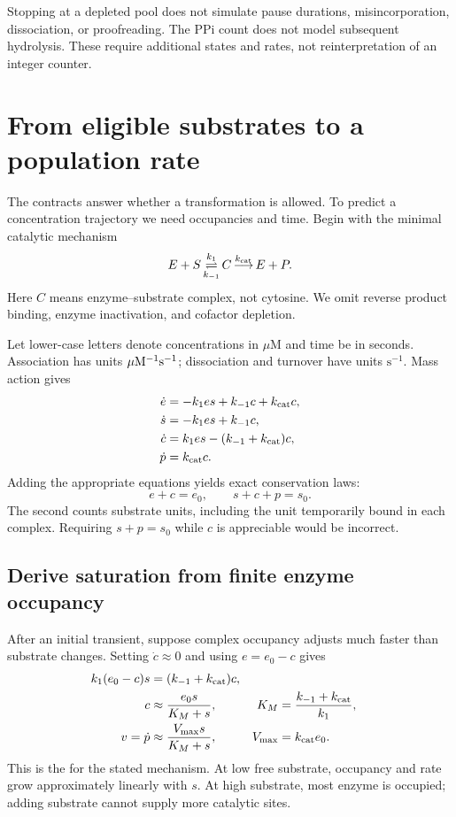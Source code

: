 Stopping at a depleted pool does not simulate pause durations, misincorporation, dissociation, or proofreading. The PPi count does not model subsequent hydrolysis. These require additional states and rates, not reinterpretation of an integer counter.

\section{From eligible substrates to a population rate}

The contracts answer whether a transformation is allowed. To predict a concentration trajectory we need occupancies and time. Begin with the minimal catalytic mechanism
\begin{equation}
E+S \mathop{\rightleftharpoons}^{k_1}_{k_{-1}} C
\mathop{\longrightarrow}^{k_{\rm cat}} E+P.
\label{eq:enzyme}
\end{equation}
Here $C$ means enzyme--substrate complex, not cytosine. We omit reverse product binding, enzyme inactivation, and cofactor depletion.

Let lower-case letters denote concentrations in $\mu$M and time be in seconds. Association has units $\mu{\rm M}^{-1}{\rm s}^{-1}$; dissociation and turnover have units $\mathrm{s}^{-1}$. Mass action gives
\begin{align}
\dot e&=-k_1es+k_{-1}c+k_{\rm cat}c,\\
\dot s&=-k_1es+k_{-1}c,\\
\dot c&=k_1es-(k_{-1}+k_{\rm cat})c,\\
\dot p&=k_{\rm cat}c.
\label{eq:full}
\end{align}
Adding the appropriate equations yields exact conservation laws:
\begin{equation}
e+c=e_0,\qquad s+c+p=s_0.
\label{eq:conservation}
\end{equation}
The second counts substrate units, including the unit temporarily bound in each complex. Requiring $s+p=s_0$ while $c$ is appreciable would be incorrect.


\subsection{Derive saturation from finite enzyme occupancy}

After an initial transient, suppose complex occupancy adjusts much faster than substrate changes. Setting $\dot c\approx0$ and using $e=e_0-c$ gives
\begin{align}
k_1(e_0-c)s&=(k_{-1}+k_{\rm cat})c,\\
c&\approx\frac{e_0s}{K_M+s},
&K_M&=\frac{k_{-1}+k_{\rm cat}}{k_1},\\
v=\dot p&\approx\frac{V_{\max}s}{K_M+s},
&V_{\max}&=k_{\rm cat}e_0.
\label{eq:mm}
\end{align}
This is the  for the stated mechanism. At low free substrate, occupancy and rate grow approximately linearly with $s$. At high substrate, most enzyme is occupied; adding substrate cannot supply more catalytic sites.

